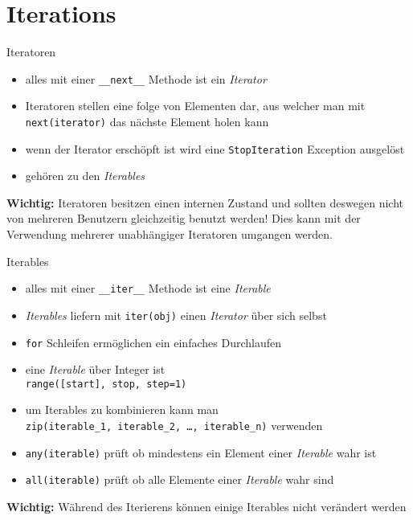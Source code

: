 \section{Iterations}

\begin{frame}{Iteratoren}
	\begin{itemize}
		\item alles mit einer \alert{\texttt{\_\_next\_\_}} Methode ist ein \textit{Iterator}
		\item Iteratoren stellen eine folge von Elementen dar, aus welcher man mit \alert{\texttt{next(iterator)}} das nächste Element holen kann
		\item wenn der Iterator erschöpft ist wird eine \alert{\texttt{StopIteration}} Exception ausgelöst
		\item gehören zu den \textit{Iterables}
	\end{itemize}
	\textbf{Wichtig:} Iteratoren besitzen einen internen Zustand und sollten deswegen nicht von mehreren Benutzern gleichzeitig benutzt werden!
	Dies kann mit der Verwendung mehrerer unabhängiger Iteratoren umgangen werden.
\end{frame}

\begin{frame}{Iterables}
	\begin{itemize}
		\item alles mit einer \alert{\texttt{\_\_iter\_\_}} Methode ist eine \textit{Iterable}
		\item \textit{Iterables} liefern mit \alert{\texttt{iter(obj)}} einen \textit{Iterator} über sich selbst
		\item \alert{\texttt{for}} Schleifen ermöglichen ein einfaches Durchlaufen
		\item eine \textit{Iterable} über Integer ist \\ \hspace{0.5cm} \texttt{range([start], stop, step=1)}
		\item um Iterables zu kombinieren kann man \\ \hspace{0.5cm} \texttt{zip(iterable\_1, iterable\_2, \ldots, iterable\_n)} verwenden
		\item \hspace{0.5cm} \texttt{any(iterable)} prüft ob mindestens ein Element einer \textit{Iterable} wahr ist
		\item \hspace{0.5cm} \texttt{all(iterable)} prüft ob alle Elemente einer \textit{Iterable} wahr sind
	\end{itemize}
	\textbf{Wichtig:} Während des Iterierens können einige Iterables nicht verändert werden
\end{frame}


